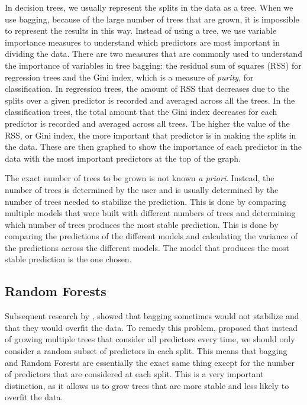 In decision trees, we usually represent the splits in the data as a tree. When we use bagging, because of the large number of trees that are grown, it is impossible to represent the results in this way. Instead of using a tree, we use variable importance measures to understand which predictors are most important in dividing the data. There are two measures that are commonly used to understand the importance of variables in tree bagging: the residual sum of squares (RSS) for regression trees and the Gini index, which is a measure of \textit{purity}, for classification. In regression trees, the amount of RSS that decreases due to the splits over a given predictor is recorded and averaged across all the trees. In the classification trees, the total amount that the Gini index decreases for each predictor is recorded and averaged across all trees. The higher the value of the RSS, or Gini index, the more important that predictor is in making the splits in the data. These are then graphed to show the importance of each predictor in the data with the most important predictors at the top of the graph.

The exact number of trees to be grown is not known \textit{a priori}. Instead, the number of trees is determined by the user and is usually determined by the number of trees needed to stabilize the prediction. This is done by comparing multiple models that were built with different numbers of trees and determining which number of trees produces the most stable prediction. This is done by comparing the predictions of the different models and calculating the variance of the predictions across the different models. The model that produces the most stable prediction is the one chosen.

\subsection{Random Forests} \label{sec:random_forests}

Subsequent research by \citet{breimanRandomForests2001}, showed that bagging sometimes would not stabilize and that they would overfit the data. To remedy this problem, \citeauthor{breimanRandomForests2001} proposed that instead of growing multiple trees that consider all predictors every time, we should only consider a random subset of predictors in each split. This means that bagging and Random Forests are essentially the exact same thing except for the number of predictors that are considered at each split. This is a very important distinction, as it allows us to grow trees that are more stable and less likely to overfit the data. 

